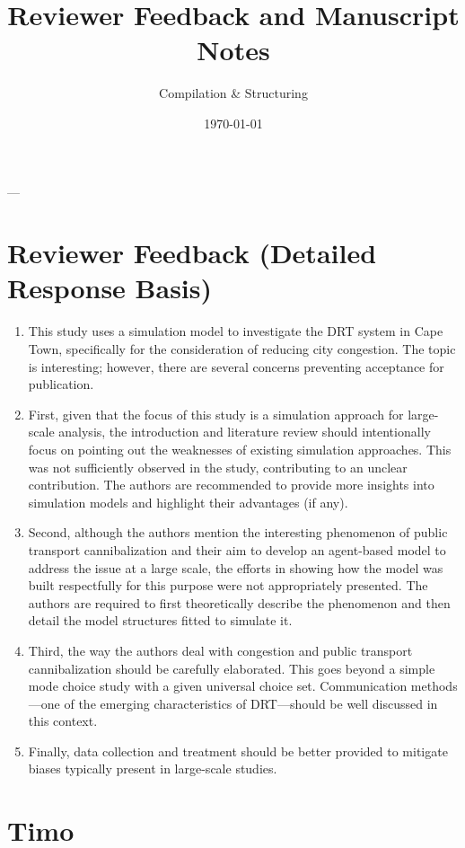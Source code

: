 \documentclass[11pt, a4paper]{article}
\begin{document}
\title{\textbf{Reviewer Feedback and Manuscript Notes}}
\author{Compilation \& Structuring}
\date{\today}
\maketitle


---

\section{Reviewer Feedback (Detailed Response Basis)}

\begin{enumerate}
    \item This study uses a simulation model to investigate the DRT system in Cape Town, specifically for the consideration of reducing city congestion. The topic is interesting; however, there are several concerns preventing acceptance for publication.
    \item First, given that the focus of this study is a simulation approach for large-scale analysis, the introduction and literature review should intentionally focus on pointing out the weaknesses of existing simulation approaches. This was not sufficiently observed in the study, contributing to an unclear contribution. The authors are recommended to provide more insights into simulation models and highlight their advantages (if any).
    \item Second, although the authors mention the interesting phenomenon of public transport cannibalization and their aim to develop an agent-based model to address the issue at a large scale, the efforts in showing how the model was built respectfully for this purpose were not appropriately presented. The authors are required to first theoretically describe the phenomenon and then detail the model structures fitted to simulate it.
    \item Third, the way the authors deal with congestion and public transport cannibalization should be carefully elaborated. This goes beyond a simple mode choice study with a given universal choice set. Communication methods—one of the emerging characteristics of DRT—should be well discussed in this context.
    \item Finally, data collection and treatment should be better provided to mitigate biases typically present in large-scale studies.
\end{enumerate}

\section{Timo}
\end{document}
